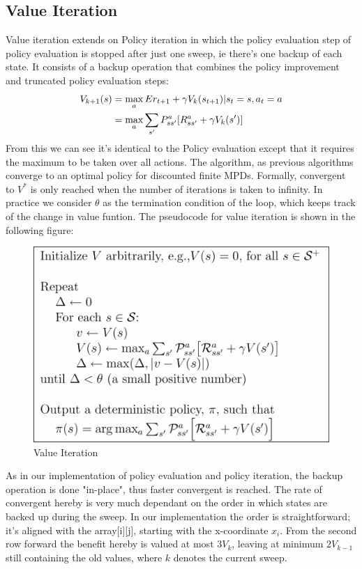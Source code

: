 \documentclass[paper=a4, fontsize=11pt]{scrartcl}
\numberwithin{equation}{section}		%
\numberwithin{figure}{section}			%
\numberwithin{table}{section}				%
\begin{document}
\subsection{Value Iteration}
\label{VIter}
Value iteration extends on Policy iteration in which the policy evaluation step of policy evaluation is stopped after just one sweep, ie there's one backup of each state. It consists of a backup operation that combines the policy improvement and truncated policy evaluation steps:
\begin{align}
V_{k+1}(s) &= \max_{a} E{r_{t+1} + \gamma V_k(s_{t+1}) | s_t=s, a_t=a}\notag\\
& = \max_{a} \sum_{s'} P_{ss'}^a [R_{ss'}^a + \gamma V_k(s')]
\end{align}
From this we can see it's identical to the Policy evaluation except that it requires the maximum to be taken over all actions. The algorithm, as previous algorithms converge to an optimal policy for discounted finite MPDs. Formally, convergent to $V^{*}$ is only reached when the number of iterations is taken to infinity. In practice we consider $\theta$ as the termination condition of the loop, which keeps track of the change in value funtion. The pseudocode for value iteration is shown in the following figure:
\begin{figure}[H] \centering
\includegraphics[scale=0.6]{sutton4_5valueiteration.png}
\caption{Value Iteration ~\cite{suttonBarto}} \label{Value Iteration}
\end{figure}
As in our implementation of policy evaluation and policy iteration, the backup operation is done "in-place", thus faster convergent is reached. The rate of convergent hereby is very much dependant on the order in which states are backed up during the sweep. In our implementation the order is straightforward; it's aligned with the array[i][j], starting with the x-coordinate $x_i$. From the second row forward the benefit hereby is valued at most $3V_{k}$, leaving at minimum $2V_{k-1}$ still containing the old values, where $k$ denotes the current sweep.
\end{document}
